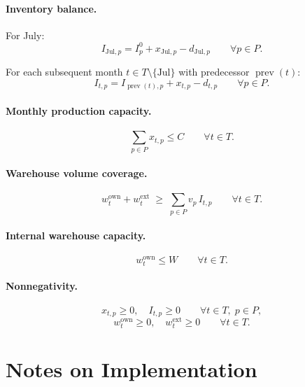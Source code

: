 \paragraph{Inventory balance.}
For July:
\[
I_{\text{Jul},p} = I^0_p + x_{\text{Jul},p} - d_{\text{Jul},p}
\qquad \forall p\in P.
\]

For each subsequent month $t\in T\setminus\{\text{Jul}\}$ with predecessor $\operatorname{prev}(t)$:
\[
I_{t,p} = I_{\operatorname{prev}(t),p} + x_{t,p} - d_{t,p}
\qquad \forall p\in P.
\]

\paragraph{Monthly production capacity.}
\[
\sum_{p\in P} x_{t,p} \le C
\qquad \forall t\in T.
\]

\paragraph{Warehouse volume coverage.}
\[
w^{\mathrm{own}}_t + w^{\mathrm{ext}}_t
\;\ge\;
\sum_{p\in P} v_p\, I_{t,p}
\qquad \forall t\in T.
\]

\paragraph{Internal warehouse capacity.}
\[
w^{\mathrm{own}}_t \le W
\qquad \forall t\in T.
\]

\paragraph{Nonnegativity.}
\[
x_{t,p}\ge 0,\quad I_{t,p}\ge 0
\qquad \forall t\in T,\; p\in P,
\]
\[
w^{\mathrm{own}}_t \ge 0,\quad w^{\mathrm{ext}}_t \ge 0
\qquad \forall t\in T.
\]

\section*{Notes on Implementation}

